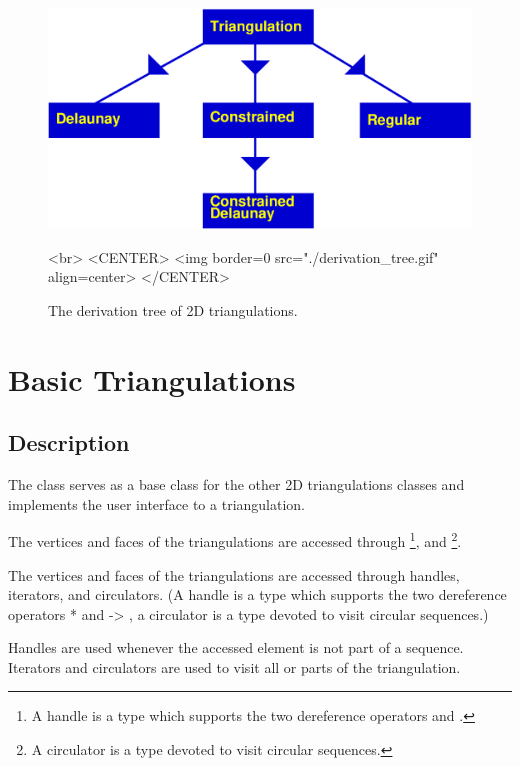 \begin{figure}
\begin{ccTexOnly}
\begin{center}
\includegraphics[width=13cm]{derivation_tree.eps} 
\end{center}
\end{ccTexOnly}
\caption{The derivation tree of 2D triangulations.}
\label{2D_Triangulation_Fig_derivation_tree}
\begin{ccHtmlOnly}
<br>
<CENTER>
<img border=0 src="./derivation_tree.gif" align=center>
</CENTER>
\end{ccHtmlOnly}
\end{figure}

\section{Basic Triangulations}
\label{Section_2D_Triangulations_Basic}

\subsection{Description}
\label{Subsection_2D_Triangulations_Basic_Description}

The class 
serves as a base class for the other
2D triangulations classes
and 
 implements the user
interface to a triangulation.



\begin{ccTexOnly}
The vertices and faces of the triangulations are accessed through 
\footnote{A handle is a type which supports the two
dereference operators \ccc{*} and \ccc{->}.},
 and 
\footnote{A circulator is a type devoted to visit circular sequences.}.
\end{ccTexOnly}
 \begin{ccHtmlOnly}
The vertices and faces of the triangulations are accessed through
handles,
iterators, and circulators. 
(A handle is a type which supports the two
dereference operators  *  and -> ,
a circulator is a type devoted to visit circular sequences.)
 \end{ccHtmlOnly}
Handles are used whenever the accessed element 
is not part of a sequence.
Iterators  and circulators are used
to visit  all or parts of the triangulation.

